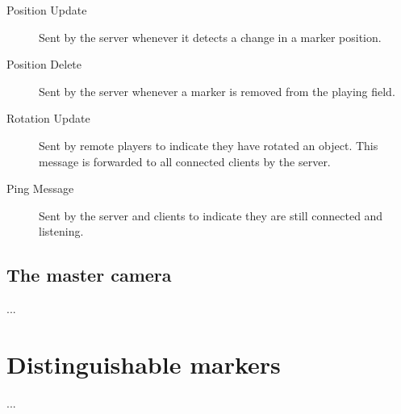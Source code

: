             \begin{description}
                \item[Position Update] Sent by the server whenever it detects a 
                                       change in a marker position.
                \item[Position Delete] Sent by the server whenever a marker is
                                       removed from the playing field.
                \item[Rotation Update] Sent by remote players to indicate they 
                                       have rotated an object. This message is 
                                       forwarded to all connected clients by the
                                       server.
                \item[Ping Message]    Sent by the server and clients to indicate 
                                       they are still connected and listening.
            \end{description}
		
		\subsection{The master camera} \label{ssec:mastercamera}
			...
			
	\section{Distinguishable markers} \label{sec:markers}
		...